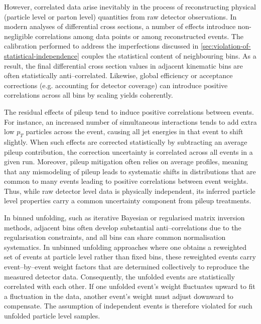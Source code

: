     However, correlated data arise inevitably in the process of reconstructing physical (particle level or parton level) quantities from raw detector observations.
    In modern analyses of differential cross sections, a number of effects introduce non-negligible correlations among data points or among reconstructed events.
    The calibration performed to address the imperfections discussed in \cref{sec:violation-of-statistical-independence} couples the statistical content of neighbouring bins.
    As a result, the final differential cross section values in adjacent kinematic bins are often statistically anti--correlated.
    Likewise, global efficiency or acceptance corrections (e.g. accounting for detector coverage) can introduce positive correlations across all bins by scaling yields coherently.

    The residual effects of pileup tend to induce positive correlations between events.
    For instance, an increased number of simultaneous interactions tends to add extra low $p_T$ particles across the event, causing all jet energies in that event to shift slightly.
    When such effects are corrected statistically by subtracting an average pileup contribution, the correction uncertainty is correlated across all events in a given run.
    Moreover, pileup mitigation often relies on average profiles, meaning that any mismodeling of pileup leads to systematic shifts in distributions that are common to many events leading to positive correlations between event weights.
    Thus, while raw detector level data is physically independent, its inferred particle level properties carry a common uncertainty component from pileup treatments.
    
    In binned unfolding, such as iterative Bayesian or regularised matrix inversion methods, adjacent bins often develop substantial anti--correlations due to the regularisation constraints, and all bins can share common normalisation systematics.
    In unbinned unfolding approaches where one obtains a reweighted set of events at particle level rather than fixed bins, these reweighted events carry event--by--event weight factors that are determined collectively to reproduce the measured detector data.
    Consequently, the unfolded events are statistically correlated with each other.
    If one unfolded event’s weight fluctuates upward to fit a fluctuation in the data, another event’s weight must adjust downward to compensate.
    The assumption of independent events is therefore violated for such unfolded particle level samples.

